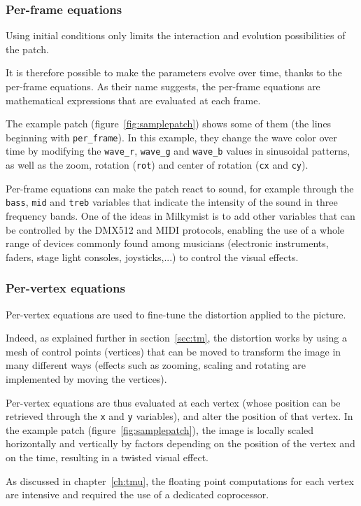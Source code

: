 \documentclass[a4paper,11pt]{kthesis}
\begin{document}
\subsubsection{Per-frame equations}
Using initial conditions only limits the interaction and evolution possibilities of the patch.

It is therefore possible to make the parameters evolve over time, thanks to the per-frame equations. As their name suggests, the per-frame equations are mathematical expressions that are evaluated at each frame.

The example patch (figure~\ref{fig:samplepatch}) shows some of them (the lines beginning with \verb!per_frame!). In this example, they change the wave color over time by modifying the \verb!wave_r!, \verb!wave_g! and \verb!wave_b! values in sinusoidal patterns, as well as the zoom, rotation (\verb!rot!) and center of rotation (\verb!cx! and \verb!cy!).

Per-frame equations can make the patch react to sound, for example through the \verb!bass!, \verb!mid! and \verb!treb! variables that indicate the intensity of the sound in three frequency bands. One of the ideas in Milkymist is to add other variables that can be controlled by the DMX512 and MIDI protocols, enabling the use of a whole range of devices commonly found among musicians (electronic instruments, faders, stage light consoles, joysticks,...) to control the visual effects.

\subsubsection{Per-vertex equations}
Per-vertex equations are used to fine-tune the distortion applied to the picture.

Indeed, as explained further in section~\ref{sec:tm}, the distortion works by using a mesh of control points (vertices) that can be moved to transform the image in many different ways (effects such as zooming, scaling and rotating are implemented by moving the vertices).

Per-vertex equations are thus evaluated at each vertex (whose position can be retrieved through the \verb!x! and \verb!y! variables), and alter the position of that vertex. In the example patch (figure~\ref{fig:samplepatch}), the image is locally scaled horizontally and vertically by factors depending on the position of the vertex and on the time, resulting in a twisted visual effect.

As discussed in chapter~\ref{ch:tmu}, the floating point computations for each vertex are intensive and required the use of a dedicated coprocessor.
\end{document}
